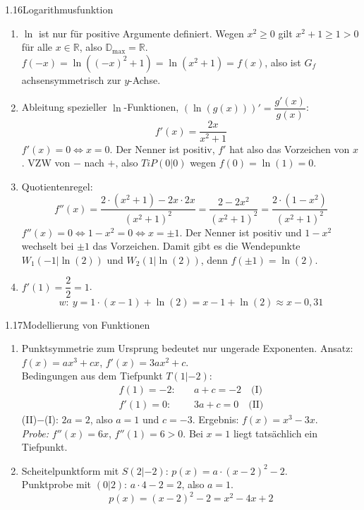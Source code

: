 \begin{loesung}{1.16}{Logarithmusfunktion}
\begin{enumerate}[label=\alph*)]
  \item $\ln$ ist nur für positive Argumente definiert. Wegen $x^2\geq 0$ gilt $x^2+1\geq 1>0$ für alle $x\in\mathds{R}$, also $\mathds{D}_{\text{max}} = \mathds{R}$.\\
  $f(-x) = \ln{((-x)^2+1)} = \ln{(x^2+1)} = f(x)$, also ist $G_f$ achsensymmetrisch zur $y$-Achse.
  \item Ableitung spezieller $\ln$-Funktionen, $\left(\ln{(g(x))}\right)' = \dfrac{g'(x)}{g(x)}$:
  \[f'(x) = \dfrac{2x}{x^2+1}\]
  $f'(x)=0\Longleftrightarrow x=0$. Der Nenner ist positiv, $f'$ hat also das Vorzeichen von $x$. VZW von $-$ nach $+$, also $TiP(0|0)$ wegen $f(0)=\ln{(1)}=0$.
  \item Quotientenregel:
  \[f''(x) = \dfrac{2\cdot(x^2+1)-2x\cdot 2x}{(x^2+1)^2} = \dfrac{2-2x^2}{(x^2+1)^2} = \dfrac{2\cdot(1-x^2)}{(x^2+1)^2}\]
  $f''(x)=0\Longleftrightarrow 1-x^2=0\Longleftrightarrow x=\pm 1$. Der Nenner ist positiv und $1-x^2$ wechselt bei $\pm 1$ das Vorzeichen. Damit gibt es die Wendepunkte $W_1(-1|\ln{(2)})$ und $W_2(1|\ln{(2)})$, denn $f(\pm 1) = \ln{(2)}$.
  \item $f'(1) = \dfrac{2}{2} = 1$.
  \[w:\ y = 1\cdot(x-1)+\ln{(2)} = x-1+\ln{(2)}\approx x-0{,}31\]
\end{enumerate}
\end{loesung}


\begin{loesung}{1.17}{Modellierung von Funktionen}
\begin{enumerate}[label=\alph*)]
  \item Punktsymmetrie zum Ursprung bedeutet nur ungerade Exponenten. Ansatz: $f(x) = ax^3+cx$, $f'(x) = 3ax^2+c$.\\
  Bedingungen aus dem Tiefpunkt $T(1|-2)$:
  \begin{align*}
    f(1) = -2:&\quad a+c = -2 \quad\text{(I)}\\
    f'(1) = 0:&\quad 3a+c = 0 \quad\text{(II)}
  \end{align*}
  (II)$-$(I): $2a = 2$, also $a=1$ und $c=-3$. Ergebnis: $f(x) = x^3-3x$.\\
  \textit{Probe:} $f''(x)=6x$, $f''(1)=6>0$. Bei $x=1$ liegt tatsächlich ein Tiefpunkt.
  \item Scheitelpunktform mit $S(2|-2)$: $p(x) = a\cdot(x-2)^2-2$.\\
  Punktprobe mit $(0|2)$: $a\cdot 4-2 = 2$, also $a=1$.
  \[p(x) = (x-2)^2-2 = x^2-4x+2\]
\end{enumerate}
\end{loesung}

